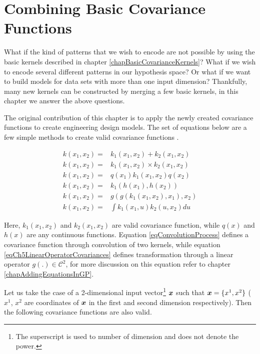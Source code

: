 \chapter{Combining Basic Covariance Functions}
\label{chapCombiningBasicCovariances}

What if the kind of patterns that we wish to encode are not possible by using the basic kernels described in chapter \ref{chapBasicCovarianceKernels}? What if we wish to encode several different patterns in our hypothesis space? Or what if we want to build models for data sets with more than one input dimension? Thankfully, many new kernels can be constructed by merging a few basic kernels, in this chapter we answer the above questions. 

The original contribution of this chapter is to apply the newly created covariance functions to create engineering design models. The set of equations below are a few simple methods to create valid covariance functions \cite{bishop2006pattern, mackay2003information, durrande2001etude, durrande2013anova}. 

\begin{align}
k(x_{1}, x_{2}) =  & k_{1}(x_{1}, x_{2}) + k_{2}(x_{1}, x_{2})  \label{eqCh5AddingCovariances} \\
k(x_{1}, x_{2}) =  & k_{1}(x_{1}, x_{2}) \times k_{2}(x_{1}, x_{2}) \label{eqCh5MultiplyingCovariances} \\
k(x_{1}, x_{2}) =  & q(x_{1})k_{1}(x_{1}, x_{2})q(x_{2}) \label{eqCh5MultiplyingWithFunction} \\
k(x_{1}, x_{2}) =  & k_{1}(h(x_{1}), h(x_{2})) \label{eqCh5ComposedCovariances} \\
k(x_{1}, x_{2}) =  & g(g(k_{1}(x_{1}, x_{2}), x_{1}), x_{2} ) \label{eqCh5LinearOperatorCovariances} \\
k(x_{1}, x_{2}) = & \int k_{1}(x_{1}, u)k_{2}(u, x_{2})du \label{eqConvolutionProcess}
\end{align}


Here, $k_{1}(x_{1}, x_{2})$ and $k_{2}(x_{1}, x_{2})$ are valid covariance function, while $q(x)$ and $h(x)$ are any continuous functions. Equation \ref{eqConvolutionProcess} defines a covariance function through convolution of two kernels, while equation \ref{eqCh5LinearOperatorCovariances} defines transformation through a linear operator $g\left ( . \right ) \in \mathcal{C}^{2}$, for more discussion on this equation refer to chapter \ref{chapAddingEquationsInGP}. 

Let us take the case of a 2-dimensional input vector\footnote{The superscript is used to number of dimension and does not denote the power.} $\boldsymbol{x}$ such that $\boldsymbol{x} = \{x^{1}, x^{2}\}$ ($x^{1}$, $x^{2}$ are coordinates of $\boldsymbol{x}$ in the first and second dimension respectively). Then the following covariance functions are also valid.

